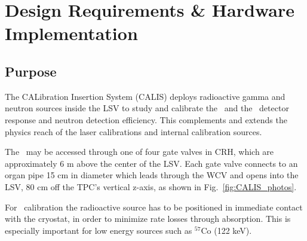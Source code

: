 \section{Design Requirements \& Hardware Implementation} \label{sec:hardware}\label{sec:design_requirements}

\subsection{Purpose}
The CALibration Insertion System (CALIS) deploys radioactive gamma and neutron sources inside the LSV to study and calibrate the \tpc\ and the \lsv\ detector response and neutron detection efficiency. This complements and extends the physics reach of the laser calibrations and internal calibration sources. 

The \lsv\ may be accessed through one of four gate valves in CRH, which are approximately 6 m above the center of the LSV. Each gate valve connects to an organ pipe 15 cm in diameter which leads through the WCV and opens into the LSV, 80 cm off the TPC's vertical z-axis, as shown in Fig.~\ref{fig:CALIS_photos}.

For \tpc\ calibration the radioactive source has to be positioned in immediate contact with the cryostat, in order to minimize rate losses through absorption. This is especially important for low energy sources such as $^{57}$Co (122 keV). 

